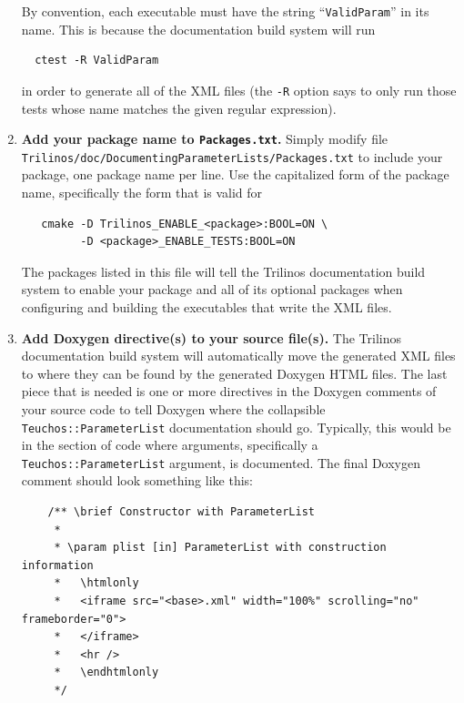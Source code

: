 \documentclass[pdf,ps2pdf,12pt]{smemo}
\begin{document}
\begin{memo}
\begin{enumerate}
  By convention, each executable must have the string
  ``\texttt{ValidParam}'' in its name.  This is because the
  documentation build system will run

 \begin{verbatim}
  ctest -R ValidParam
 \end{verbatim}

  in order to generate all of the XML files (the \texttt{-R} option
  says to only run those tests whose name matches the given regular
  expression).

\item \textbf{Add your package name to \texttt{Packages.txt}.} Simply
  modify file
  \texttt{Trilinos/\-doc/\-Documenting\-Parameter\-Lists/\-Packages.txt}
  to include your package, one package name per line.  Use the
  capitalized form of the package name, specifically the form that is
  valid for

 \begin{verbatim}
   cmake -D Trilinos_ENABLE_<package>:BOOL=ON \
         -D <package>_ENABLE_TESTS:BOOL=ON
 \end{verbatim}

  The packages listed in this file will tell the Trilinos
  documentation build system to enable your package and all of its
  optional packages when configuring and building the executables that
  write the XML files.

\item \textbf{Add Doxygen directive(s) to your source file(s).} The
  Trilinos documentation build system will automatically move the
  generated XML files to where they can be found by the generated
  Doxygen HTML files. The last piece that is needed is one or more
  directives in the Doxygen comments of your source code to tell
  Doxygen where the collapsible \texttt{Teuchos::ParameterList}
  documentation should go. Typically, this would be in the section of
  code where arguments, specifically a \texttt{Teuchos::ParameterList}
  argument, is documented. The final Doxygen comment should look
  something like this:

 \footnotesize
 \begin{verbatim}
    /** \brief Constructor with ParameterList
     * 
     * \param plist [in] ParameterList with construction information
     *   \htmlonly
     *   <iframe src="<base>.xml" width="100%" scrolling="no" frameborder="0">
     *   </iframe>
     *   <hr />
     *   \endhtmlonly
     */
 \end{verbatim}
 \normalsize


\end{enumerate}
\end{memo}
\end{document}
